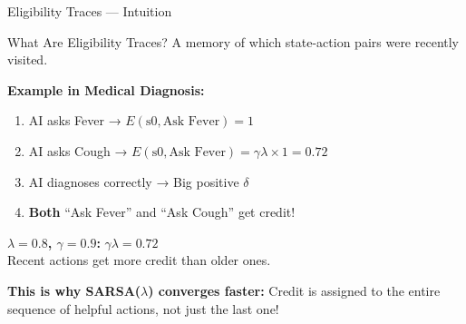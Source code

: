 \documentclass[aspectratio=169]{beamer}
\begin{document}
\begin{frame}{Eligibility Traces — Intuition}
    \begin{block}{What Are Eligibility Traces?}
        A memory of which state-action pairs were recently visited.
    \end{block}

    \vspace{0.3cm}

    \textbf{Example in Medical Diagnosis:}
    \begin{enumerate}
        \item AI asks Fever → $E(\text{s0}, \text{Ask Fever}) = 1$
        \item AI asks Cough → $E(\text{s0}, \text{Ask Fever}) = \gamma\lambda \times 1 = 0.72$
        \item AI diagnoses correctly → Big positive $\delta$
        \item \textbf{Both} ``Ask Fever'' and ``Ask Cough'' get credit!
    \end{enumerate}

    \vspace{0.3cm}

    \textbf{$\lambda = 0.8$, $\gamma = 0.9$:} $\gamma\lambda = 0.72$\\
    Recent actions get more credit than older ones.

    \vspace{0.3cm}

    \textbf{This is why SARSA($\lambda$) converges faster:} Credit is assigned to the entire sequence of helpful actions, not just the last one!
\end{frame}
\end{document}
